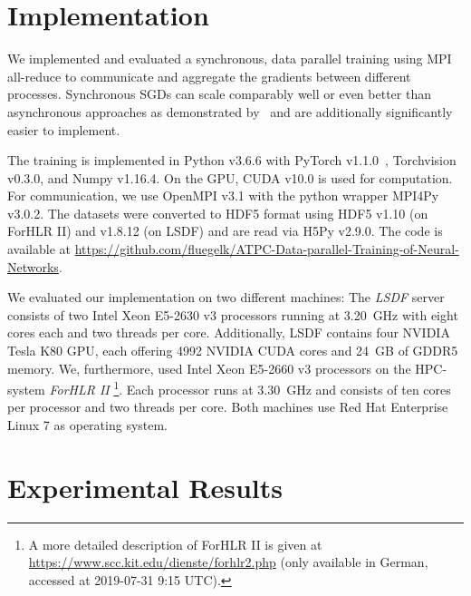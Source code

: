 \documentclass[conference]{IEEEtran}
\begin{document}




\section{Implementation} %
\label{sec:implementation}
We implemented and evaluated a synchronous, data parallel training using MPI all-reduce to communicate and aggregate the gradients between different processes.
Synchronous SGDs can scale comparably well or even better than asynchronous approaches as demonstrated by~\cite{jin2016-How-to-scale,chen2016-Revisiting-distributed-synchronous-SGD} and are additionally significantly easier to implement.

The training is implemented in Python v3.6.6 with PyTorch v1.1.0~\cite{paszke2017automatic}, Torchvision v0.3.0, and Numpy v1.16.4.
On the GPU, CUDA v10.0 is used for computation.
For communication, we use OpenMPI v3.1 with the python wrapper MPI4Py v3.0.2.
The datasets were converted to HDF5 format using HDF5 v1.10 (on ForHLR II) and v1.8.12 (on LSDF) and are read via H5Py v2.9.0.
The code is available at \url{https://github.com/fluegelk/ATPC-Data-parallel-Training-of-Neural-Networks}.

We evaluated our implementation on two different machines:
The \emph{LSDF} server consists of two Intel Xeon E5-2630 v3 processors running at 3.20~GHz with eight cores each and two threads per core.
Additionally, LSDF contains four NVIDIA Tesla K80 GPU, each offering 4992 NVIDIA CUDA cores and 24~GB of GDDR5 memory.
%
We, furthermore, used Intel Xeon E5-2660 v3 processors on the HPC-system \emph{ForHLR II}
\footnote{A more detailed description of ForHLR II is given at \url{https://www.scc.kit.edu/dienste/forhlr2.php} (only available in German, accessed at 2019-07-31 9:15 UTC).}.
Each processor runs at 3.30~GHz and consists of ten cores per processor and two threads per core.
%
Both machines use Red Hat Enterprise Linux 7 as operating system.


\section{Experimental Results} %
\label{sec:experimental_results}
\end{document}
